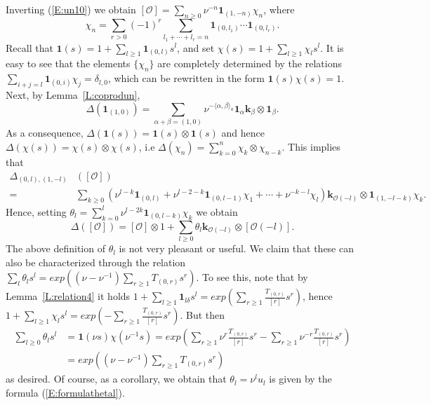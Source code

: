 \documentclass[a4paper,10pt]{amsart}
\def\a{\alpha}
\def\O{\mathcal{O}}
\numberwithin{equation}{section}
\begin{document}
{Inverting (\ref{E:un10}) we obtain $[\O]=\sum_{n \geq 0} \nu^{-n} \mathbf{1}_{(1,-n)}\chi_n$, where
$$\chi_n=\sum_{r >0}(-1)^r \sum_{l_1+\cdots + l_r=n} \mathbf{1}_{(0,l_1)} \cdots \mathbf{1}_{(0,l_r)}.$$
Recall that $\mathbf{1}(s)=1+\sum_{l \geq 1} \mathbf{1}_{(0,l)}s^l$, and set $\chi(s)=1+\sum_{l \geq 1} \chi_l s^l$. It is easy to see  that the elements  $\{\chi_n\}$ are completely determined by the relations
$\sum_{i+j=l} \mathbf{1}_{(0,i)} \chi_j=\delta_{l,0}$,  which can  be rewritten in the form  $\mathbf{1}(s) \chi(s)=1$. Next, by Lemma~\ref{L:coprodun},
\begin{equation}\label{E:un101}
\Delta(\mathbf{1}_{(1,0)})=\sum_{\a+\beta=(1,0)} \nu^{-\langle \a,\beta\rangle_a}\mathbf{1}_{\a}\mathbf{k}_{\beta} \otimes \mathbf{1}_{\beta}.
\end{equation}
As a consequence, $\Delta(\mathbf{1}(s))=\mathbf{1}(s) \otimes \mathbf{1}(s)$ and hence
$\Delta(\chi(s))=\chi(s) \otimes \chi(s)$, i.e
$\Delta(\chi_{n})=\sum_{k=0}^n\chi_k \otimes \chi_{n-k}$. This implies that
\begin{equation*}
\begin{split}
\Delta_{(0,l), (1,-l)}&([\O])\\
=&\sum_{k \geq 0}(\nu^{l-k} \mathbf{1}_{(0,l)} +
\nu^{l-2-k} \mathbf{1}_{(0,l-1)}\chi_1 + \cdots + \nu^{-k-l} \chi_l)\mathbf{k}_{\O(-l)} \otimes \mathbf{1}_{(1,-l-k)}
\chi_{k}.
\end{split}
\end{equation*}
Hence, setting $\theta_l=\sum_{k=0}^l \nu^{l-2k} \mathbf{1}_{(0,l-k)}\chi_k$ we obtain
$$\Delta([\O]) =[\O] \otimes 1 + \sum_{l \geq 0} \theta_l\mathbf{k}_{\O(-l)} \otimes [\O(-l)].$$
The above definition of $\theta_l$ is not very pleasant or useful.
We claim that these can also be characterized through
the relation $\sum_l \theta_l s^l=
exp((\nu-\nu^{-1})\sum_{r \geq 1} T_{(0,r)}s^r)$. To see this, note that by Lemma~\ref{L:relation4} it holds
$1+\sum_{l \geq 1} \mathbf{1}_{l\delta}s^l =exp(\sum_{r \geq 1} \frac{T_{(0,r)}}{[r]} s^r)$, hence
$1+\sum_{l \geq 1} \chi_ls^l=exp(-\sum_{r \geq 1} \frac{T_{(0,r)}}{[r]} s^r)$. But then
\begin{equation*}
  \begin{split}
\sum_{l \geq 0}  \theta_l s^l&=\mathbf{1}(\nu s)\chi(\nu^{-1}s) = exp(\sum_{r \geq 1}
\nu^{r} \frac{T_{(0,r)}}{[r]} s^r -\sum_{r \geq 1} \nu^{-r} \frac{T_{(0,r)}}{[r]} s^r)\\
&= exp((\nu-\nu^{-1})\sum_{r \geq 1} T_{(0,r)}s^r)
\end{split}
\end{equation*}
as desired. Of course, as a corollary, we obtain that $\theta_l=\nu^{l}u_l$ is given by the formula (\ref{E:formulathetal}).

}
\end{document}
